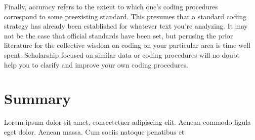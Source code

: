 Finally, accuracy refers to the extent to which one’s coding procedures correspond to some preexisting standard. This presumes that a standard coding strategy has already been established for whatever text you’re analyzing. It may not be the case that official standards have been set, but perusing the prior literature for the collective wisdom on coding on your particular area is time well spent. Scholarship focused on similar data or coding procedures will no doubt help you to clarify and improve your own coding procedures.


\section{Summary}\label{ch12:summary}

Lorem ipsum dolor sit amet, consectetuer adipiscing elit. Aenean commodo ligula eget dolor. Aenean massa. Cum sociis natoque penatibus et
